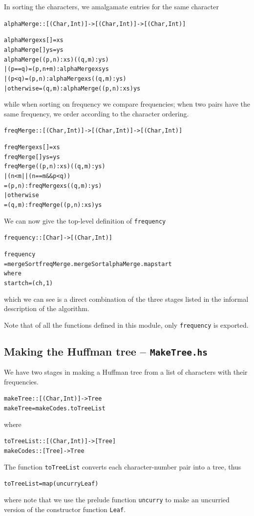 In sorting the characters, we amalgamate entries for the same character
\begin{alltt}
alphaMerge :: [(Char,Int)] -> [(Char,Int)] -> [(Char,Int)]	

alphaMerge xs [] = xs
alphaMerge [] ys = ys
alphaMerge ((p,n):xs) ((q,m):ys)
  | (p==q)      = (p,n+m) : alphaMerge xs ys		
  | (p<q)       = (p,n) : alphaMerge xs ((q,m):ys)	
  | otherwise   = (q,m) : alphaMerge ((p,n):xs) ys	
\end{alltt}
while when sorting on frequency we compare frequencies; when two
pairs have the same frequency, we order according to the character ordering.
\begin{alltt}
freqMerge :: [(Char,Int)] -> [(Char,Int)] -> [(Char,Int)]	

freqMerge xs [] = xs
freqMerge [] ys = ys
freqMerge ((p,n):xs) ((q,m):ys)
  | (n<m || (n==m && p<q)) 
    = (p,n) : freqMerge xs ((q,m):ys)	
  | otherwise 
    = (q,m) : freqMerge ((p,n):xs) ys	
\end{alltt}
We can now give the top-level definition of \texttt{frequency}
\begin{alltt}
frequency :: [Char] -> [ (Char,Int) ]

frequency
  = mergeSort freqMerge . mergeSort alphaMerge . map start
    where
    start ch = (ch,1)
\end{alltt}
which we can see is a direct combination of the three stages listed in the
informal description of the algorithm.

Note that of all the functions defined in this module, only \texttt{frequency}
is exported.

\subsection*{Making the Huffman tree -- \texttt{MakeTree.hs}}

We have two stages in making a Huffman tree from a list of characters with
their frequencies.
\begin{alltt}
makeTree :: [ (Char,Int) ] -> Tree
makeTree  = makeCodes . toTreeList
\end{alltt}
where
\begin{alltt}
toTreeList :: [ (Char,Int) ] -> [Tree]
makeCodes  :: [Tree] -> Tree
\end{alltt}
The function \texttt{toTreeList} converts each character-number pair into a
tree, thus
\begin{alltt}
toTreeList = map (uncurry Leaf)
\end{alltt}
where note that we use the prelude function \texttt{uncurry} to make an uncurried version
of the constructor function \texttt{Leaf}.

